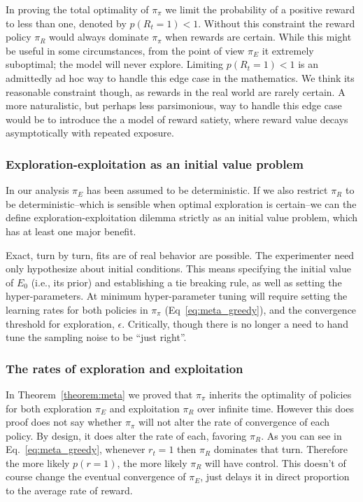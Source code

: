 \documentclass[9pt,twocolumn,twoside]{pnas-new}
\begin{document}

In proving the total optimality of $\pi_{\pi}$ we limit the probability of a positive reward to less than one, denoted by $p(R_t = 1) < 1$. Without this constraint the reward policy $\pi_R$ would always dominate $\pi_{\pi}$ when rewards are certain. While this might be useful in some circumstances, from the point of view $\pi_E$ it extremely suboptimal; the model will never explore. Limiting $p(R_t = 1) < 1$ is an admittedly ad hoc way to handle this edge case in the mathematics. We think its reasonable constraint though, as rewards in the real world are rarely certain. A more naturalistic, but perhaps less parsimonious, way to handle this edge case would be to introduce the a model of reward satiety, where reward value decays asymptotically with repeated exposure. 

\subsubsection*{Exploration-exploitation as an initial value problem}
In our analysis $\pi_E$ has been assumed to be deterministic. If we also restrict $\pi_R$ to be deterministic--which is sensible when optimal exploration is certain--we can the define exploration-exploitation dilemma strictly as an initial value problem, which has at least one major benefit.

Exact, turn by turn, fits are of real behavior are possible. The experimenter need only hypothesize about initial conditions. This means specifying the initial value of $E_0$ (i.e., its prior) and establishing a tie breaking rule, as well as setting the hyper-parameters. At minimum hyper-parameter tuning will require setting the learning rates for both policies in $\pi_{\pi}$ (Eq~\ref{eq:meta_greedy}), and the convergence threshold for exploration, $\epsilon$. Critically, though there is no longer a need to hand tune the sampling noise to be ``just right''. %


\subsubsection*{The rates of exploration and exploitation}
In Theorem~\ref{theorem:meta} we proved that $\pi_{\pi}$ inherits the optimality of policies for both exploration $\pi_E$ and exploitation $\pi_R$ over infinite time. However this does proof does not say whether $\pi_{\pi}$ will not alter the rate of convergence of each policy. By design, it does alter the rate of each, favoring $\pi_R$. As you can see in Eq.~\ref{eq:meta_greedy}, whenever $r_t = 1$ then $\pi_R$ dominates that turn. Therefore the more likely $p(r=1)$, the more likely $\pi_R$ will have control. This doesn't of course change the eventual convergence of $\pi_E$, just delays it in direct proportion to the average rate of reward.
\end{document}
